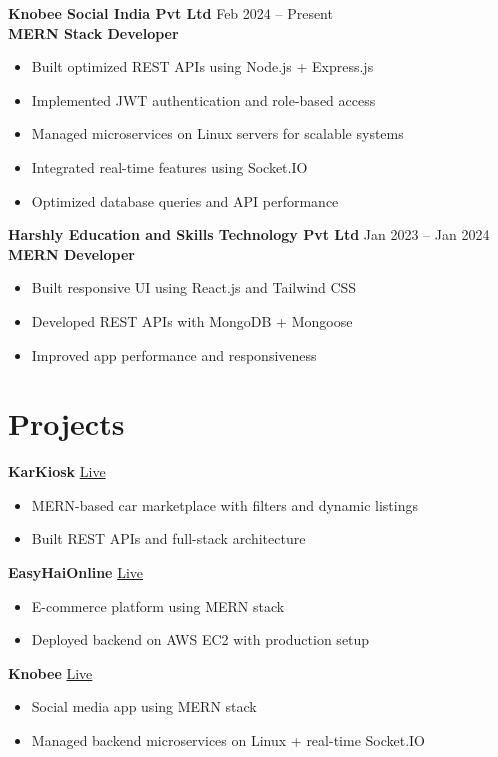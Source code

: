 \documentclass[letterpaper,11pt]{article}
\begin{document}
\textbf{Knobee Social India Pvt Ltd} \hfill Feb 2024 -- Present \\
\textbf{MERN Stack Developer}
\begin{itemize}
\item Built optimized REST APIs using Node.js + Express.js
\item Implemented JWT authentication and role-based access
\item Managed microservices on Linux servers for scalable systems
\item Integrated real-time features using Socket.IO
\item Optimized database queries and API performance
\end{itemize}

\textbf{Harshly Education and Skills Technology Pvt Ltd} \hfill Jan 2023 -- Jan 2024 \\
\textbf{MERN Developer}
\begin{itemize}
\item Built responsive UI using React.js and Tailwind CSS
\item Developed REST APIs with MongoDB + Mongoose
\item Improved app performance and responsiveness
\end{itemize}

\section{Projects}

\textbf{KarKiosk} \hfill \href{https://karkiosk.com/}{Live}
\begin{itemize}
\item MERN-based car marketplace with filters and dynamic listings
\item Built REST APIs and full-stack architecture
\end{itemize}

\textbf{EasyHaiOnline} \hfill \href{https://easyhaionline.com/}{Live}
\begin{itemize}
\item E-commerce platform using MERN stack
\item Deployed backend on AWS EC2 with production setup
\end{itemize}

\textbf{Knobee} \hfill \href{https://knobee.app/}{Live}
\begin{itemize}
\item Social media app using MERN stack
\item Managed backend microservices on Linux + real-time Socket.IO
\end{itemize}
\end{document}
